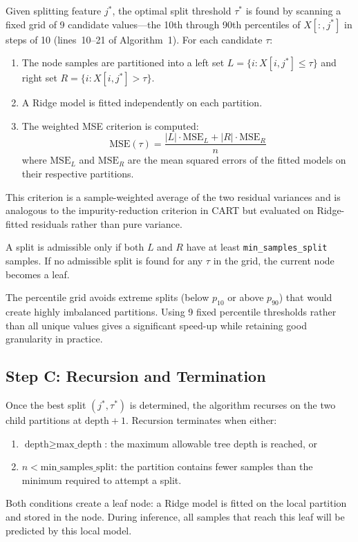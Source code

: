 \documentclass[11pt,a4paper]{article}
\begin{document}
Given splitting feature $j^*$, the optimal split threshold $\tau^*$ is found by scanning a fixed grid of 9 candidate values---the 10th through 90th percentiles of $X[:, j^*]$ in steps of 10 (lines~10--21 of Algorithm~1). For each candidate $\tau$:
\begin{enumerate}
    \item The node samples are partitioned into a left set $L = \{i : X[i, j^*] \leq \tau\}$ and right set $R = \{i : X[i, j^*] > \tau\}$.
    \item A Ridge model is fitted independently on each partition.
    \item The weighted MSE criterion is computed:
    \[
        \text{MSE}(\tau) = \frac{|L| \cdot \text{MSE}_L + |R| \cdot \text{MSE}_R}{n}
    \]
    where $\text{MSE}_L$ and $\text{MSE}_R$ are the mean squared errors of the fitted models on their respective partitions.
\end{enumerate}
This criterion is a sample-weighted average of the two residual variances and is analogous to the impurity-reduction criterion in CART but evaluated on Ridge-fitted residuals rather than pure variance.

A split is admissible only if both $L$ and $R$ have at least \texttt{min\_samples\_split} samples. If no admissible split is found for any $\tau$ in the grid, the current node becomes a leaf.

The percentile grid avoids extreme splits (below $p_{10}$ or above $p_{90}$) that would create highly imbalanced partitions. Using 9 fixed percentile thresholds rather than all unique values gives a significant speed-up while retaining good granularity in practice.

\subsection{Step C: Recursion and Termination}

Once the best split $(j^*, \tau^*)$ is determined, the algorithm recurses on the two child partitions at $\text{depth} + 1$. Recursion terminates when either:
\begin{enumerate}
    \item[(a)] $\text{depth} \geq \text{max\_depth}$: the maximum allowable tree depth is reached, or
    \item[(b)] $n < \text{min\_samples\_split}$: the partition contains fewer samples than the minimum required to attempt a split.
\end{enumerate}
Both conditions create a leaf node: a Ridge model is fitted on the local partition and stored in the node. During inference, all samples that reach this leaf will be predicted by this local model.
\end{document}
